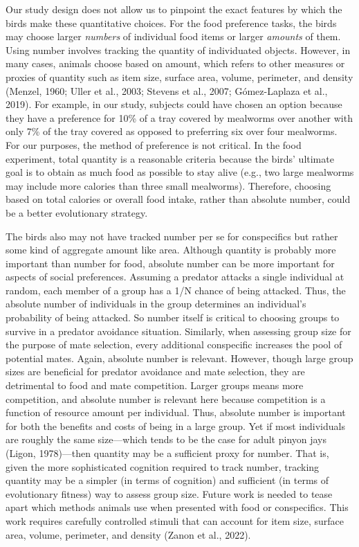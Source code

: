 \documentclass[
  ,pub,floatsintext]{apa6}
\begin{document}
Our study design does not allow us to pinpoint the exact features by which the birds make these quantitative choices. For the food preference tasks, the birds may choose larger \emph{numbers} of individual food items or larger \emph{amounts} of them. Using number involves tracking the quantity of individuated objects. However, in many cases, animals choose based on amount, which refers to other measures or proxies of quantity such as item size, surface area, volume, perimeter, and density (Menzel, 1960; Uller et al., 2003; Stevens et al., 2007; Gómez-Laplaza et al., 2019). For example, in our study, subjects could have chosen an option because they have a preference for 10\% of a tray covered by mealworms over another with only 7\% of the tray covered as opposed to preferring six over four mealworms. For our purposes, the method of preference is not critical. In the food experiment, total quantity is a reasonable criteria because the birds' ultimate goal is to obtain as much food as possible to stay alive (e.g., two large mealworms may include more calories than three small mealworms). Therefore, choosing based on total calories or overall food intake, rather than absolute number, could be a better evolutionary strategy.

The birds also may not have tracked number per se for conspecifics but rather some kind of aggregate amount like area. Although quantity is probably more important than number for food, absolute number can be more important for aspects of social preferences. Assuming a predator attacks a single individual at random, each member of a group has a 1/N chance of being attacked. Thus, the absolute number of individuals in the group determines an individual's probability of being attacked. So number itself is critical to choosing groups to survive in a predator avoidance situation. Similarly, when assessing group size for the purpose of mate selection, every additional conspecific increases the pool of potential mates. Again, absolute number is relevant. However, though large group sizes are beneficial for predator avoidance and mate selection, they are detrimental to food and mate competition. Larger groups means more competition, and absolute number is relevant here because competition is a function of resource amount per individual. Thus, absolute number is important for both the benefits and costs of being in a large group. Yet if most individuals are roughly the same size---which tends to be the case for adult pinyon jays (Ligon, 1978)---then quantity may be a sufficient proxy for number. That is, given the more sophisticated cognition required to track number, tracking quantity may be a simpler (in terms of cognition) and sufficient (in terms of evolutionary fitness) way to assess group size. Future work is needed to tease apart which methods animals use when presented with food or conspecifics. This work requires carefully controlled stimuli that can account for item size, surface area, volume, perimeter, and density (Zanon et al., 2022).
\end{document}
